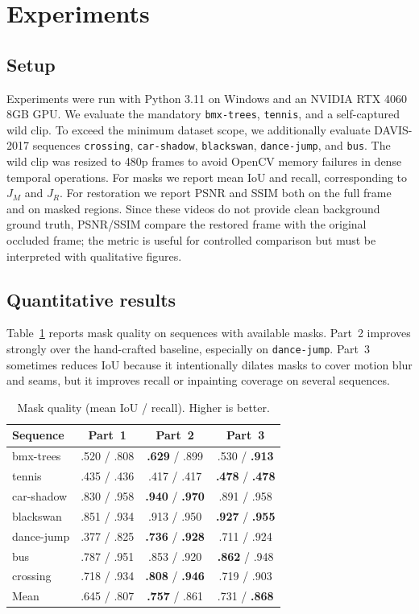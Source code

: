 \documentclass[10pt,twocolumn,letterpaper]{article}
\begin{document}
\section{Experiments}
\label{sec:exp}
\subsection{Setup}
Experiments were run with Python 3.11 on Windows and an NVIDIA RTX 4060 8GB GPU. We evaluate the mandatory \texttt{bmx-trees}, \texttt{tennis}, and a self-captured wild clip. To exceed the minimum dataset scope, we additionally evaluate DAVIS-2017 sequences \texttt{crossing}, \texttt{car-shadow}, \texttt{blackswan}, \texttt{dance-jump}, and \texttt{bus}. The wild clip was resized to 480p frames to avoid OpenCV memory failures in dense temporal operations. For masks we report mean IoU and recall, corresponding to $J_M$ and $J_R$. For restoration we report PSNR and SSIM both on the full frame and on masked regions. Since these videos do not provide clean background ground truth, PSNR/SSIM compare the restored frame with the original occluded frame; the metric is useful for controlled comparison but must be interpreted with qualitative figures.

\subsection{Quantitative results}
Table~\ref{tab:mask} reports mask quality on sequences with available masks. Part~2 improves strongly over the hand-crafted baseline, especially on \texttt{dance-jump}. Part~3 sometimes reduces IoU because it intentionally dilates masks to cover motion blur and seams, but it improves recall or inpainting coverage on several sequences.

\begin{table}[t]
  \centering
  \scriptsize
  \caption{Mask quality (mean IoU / recall). Higher is better.}
  \label{tab:mask}
  \begin{tabular}{lccc}
    \toprule
    Sequence & Part~1 & Part~2 & Part~3 \\
    \midrule
    bmx-trees & .520 / .808 & \textbf{.629} / .899 & .530 / \textbf{.913} \\
    tennis & .435 / .436 & .417 / .417 & \textbf{.478} / \textbf{.478} \\
    car-shadow & .830 / .958 & \textbf{.940} / \textbf{.970} & .891 / .958 \\
    blackswan & .851 / .934 & .913 / .950 & \textbf{.927} / \textbf{.955} \\
    dance-jump & .377 / .825 & \textbf{.736} / \textbf{.928} & .711 / .924 \\
    bus & .787 / .951 & .853 / .920 & \textbf{.862} / .948 \\
    crossing & .718 / .934 & \textbf{.808} / \textbf{.946} & .719 / .903 \\
    \midrule
    Mean & .645 / .807 & \textbf{.757} / .861 & .731 / \textbf{.868} \\
    \bottomrule
  \end{tabular}
\end{table}
\end{document}
